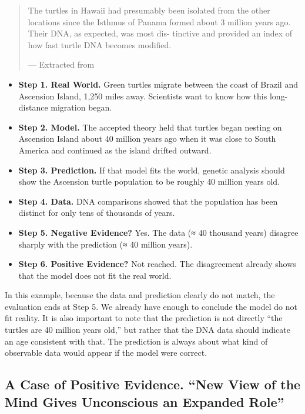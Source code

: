 \documentclass[
  12pt,
]{book}
\providecommand{\tightlist}{%
  \setlength{\itemsep}{0pt}\setlength{\parskip}{0pt}}
\begin{document}
\begin{quote}
The turtles in Hawaii had presumably been isolated from the other locations since the
Isthmus of Panama formed about 3 million years ago. Their DNA, as expected, was most dis-
tinctive and provided an index of how fast turtle DNA becomes modified.

--- Extracted from \citep{giere2006understanding}
\end{quote}

\begin{itemize}
\tightlist
\item
  \textbf{Step 1. Real World.} Green turtles migrate between the coast of Brazil and Ascension Island, 1,250 miles away. Scientists want to know how this long-distance migration began.
\item
  \textbf{Step 2. Model.} The accepted theory held that turtles began nesting on Ascension Island about 40 million years ago when it was close to South America and continued as the island drifted outward.
\item
  \textbf{Step 3. Prediction.} If that model fits the world, genetic analysis should show the Ascension turtle population to be roughly 40 million years old.
\item
  \textbf{Step 4. Data.} DNA comparisons showed that the population has been distinct for only tens of thousands of years.
\item
  \textbf{Step 5. Negative Evidence?} Yes. The data (≈ 40 thousand years) disagree sharply with the prediction (≈ 40 million years).
\item
  \textbf{Step 6. Positive Evidence?} Not reached. The disagreement already shows that the model does not fit the real world.
\end{itemize}

In this example, because the data and prediction clearly do not match, the evaluation ends at Step 5. We already have enough to conclude the model do not fit reality. It is also important to note that the prediction is not directly ``the turtles are 40 million years old,'' but rather that the DNA data should indicate an age consistent with that. The prediction is always about what kind of observable data would appear if the model were correct.

\subsection{A Case of Positive Evidence. ``New View of the Mind Gives Unconscious an Expanded Role''}\label{a-case-of-positive-evidence.-new-view-of-the-mind-gives-unconscious-an-expanded-role}
\end{document}
